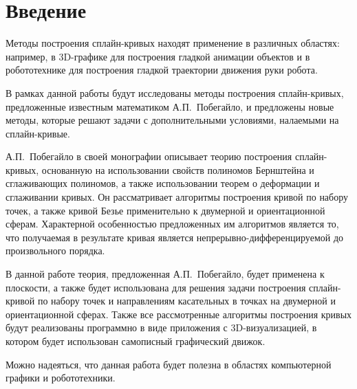 \chapter*{Введение}

Методы построения сплайн-кривых находят применение в различных областях: например, в 3D-графике для построения гладкой
анимации объектов и в робототехнике для построения гладкой траектории движения руки робота.

В рамках данной работы будут исследованы методы построения сплайн-кривых, предложенные известным математиком
А.П.~Побегайло, и предложены новые методы, которые решают задачи с дополнительными условиями, налаемыми на
сплайн-кривые.

А.П.~Побегайло в своей монографии \cite{pobegaylo} описывает теорию построения сплайн-кривых, основанную на
использовании свойств полиномов Бернштейна и сглаживающих полиномов, а также использовании теорем о деформации и
сглаживании кривых. Он рассматривает алгоритмы построения кривой по набору точек, а также кривой Безье применительно
к двумерной и ориентационной сферам. Характерной особенностью предложенных им алгоритмов является то, что получаемая
в результате кривая является непрерывно-дифференцируемой до произвольного порядка.

В данной работе теория, предложенная А.П.~Побегайло, будет применена к плоскости, а также будет использована для
решения задачи построения сплайн-кривой по набору точек и направлениям касательных в точках на двумерной и
ориентационной сферах. Также все рассмотренные алгоритмы построения кривых будут реализованы программно в виде
приложения с 3D-визуализацией, в котором будет использован самописный графический движок.

Можно надеяться, что данная работа будет полезна в областях компьютерной графики и робототехники.
